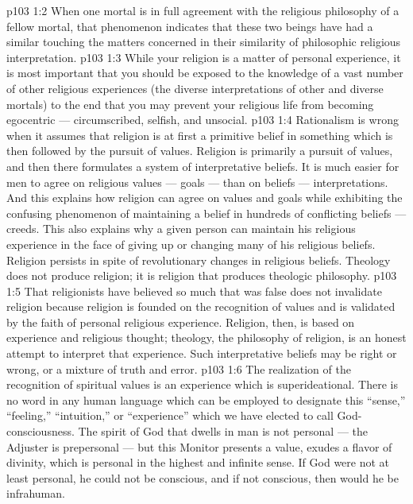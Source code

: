 \vs p103 1:2 When one mortal is in full agreement with the religious philosophy of a fellow mortal, that phenomenon indicates that these two beings have had a similar  touching the matters concerned in their similarity of philosophic religious interpretation.
\vs p103 1:3 While your religion is a matter of personal experience, it is most important that you should be exposed to the knowledge of a vast number of other religious experiences (the diverse interpretations of other and diverse mortals) to the end that you may prevent your religious life from becoming egocentric --- circumscribed, selfish, and unsocial.
\vs p103 1:4 Rationalism is wrong when it assumes that religion is at first a primitive belief in something which is then followed by the pursuit of values. Religion is primarily a pursuit of values, and then there formulates a system of interpretative beliefs. It is much easier for men to agree on religious values --- goals --- than on beliefs --- interpretations. And this explains how religion can agree on values and goals while exhibiting the confusing phenomenon of maintaining a belief in hundreds of conflicting beliefs --- creeds. This also explains why a given person can maintain his religious experience in the face of giving up or changing many of his religious beliefs. Religion persists in spite of revolutionary changes in religious beliefs. Theology does not produce religion; it is religion that produces theologic philosophy.
\vs p103 1:5 That religionists have believed so much that was false does not invalidate religion because religion is founded on the recognition of values and is validated by the faith of personal religious experience. Religion, then, is based on experience and religious thought; theology, the philosophy of religion, is an honest attempt to interpret that experience. Such interpretative beliefs may be right or wrong, or a mixture of truth and error.
\vs p103 1:6 The realization of the recognition of spiritual values is an experience which is superideational. There is no word in any human language which can be employed to designate this “sense,” “feeling,” “intuition,” or “experience” which we have elected to call God\hyp{}consciousness. The spirit of God that dwells in man is not personal --- the Adjuster is prepersonal --- but this Monitor presents a value, exudes a flavor of divinity, which is personal in the highest and infinite sense. If God were not at least personal, he could not be conscious, and if not conscious, then would he be infrahuman.
